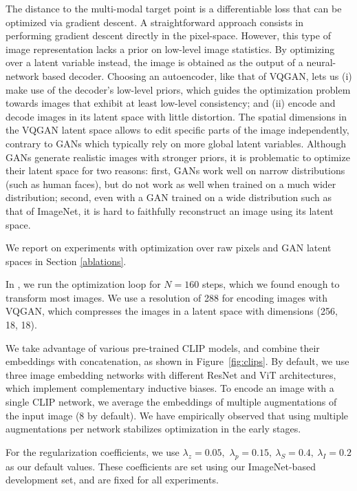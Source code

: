 The distance to the multi-modal target point is a differentiable loss that can be 
optimized via gradient descent. A straightforward approach consists in performing
 gradient descent directly in the pixel-space. However, this type of image 
 representation lacks a  prior on low-level image statistics. 
By optimizing over a  latent variable instead, the  image is obtained as the
 output of a neural-network based decoder. Choosing an autoencoder, like that of 
 VQGAN, lets us (i) make use of the decoder's low-level priors, which guides the 
 optimization problem towards images that exhibit at least low-level consistency;
  and (ii) encode and decode images in its latent space with little distortion. 
  The spatial dimensions in the VQGAN latent space allows to edit specific parts
   of the image independently, contrary to GANs which typically rely on more global 
   latent variables. 
Although GANs generate realistic images with stronger priors, it is problematic to
 optimize their latent space for two reasons: first, GANs work  well on narrow 
 distributions (such as human faces), but do not work as well when trained  on a much 
 wider distribution;
second, even with a GAN trained on a wide distribution such as that of ImageNet, it
 is hard to faithfully reconstruct  an image using its  latent space.

We report on experiments with optimization over raw pixels and GAN latent spaces in  
Section \ref{ablations}.


In \ours, we run the optimization loop for $N=160$ steps, which we found enough to 
transform most images. We use a resolution of 288 for encoding images with VQGAN,
 which compresses the images in a latent space with dimensions (256, 18, 18). 

We take advantage of  various pre-trained CLIP models, and combine their embeddings
 with concatenation, as shown in Figure~\ref{fig:clips}. 
By default, we use three image embedding networks with  different ResNet  and ViT 
architectures, which implement complementary inductive biases.
%
To encode an image with a single CLIP network, we average the embeddings of multiple
 augmentations of the input image (8 by default). We have empirically observed that 
 using multiple augmentations per network stabilizes optimization in the early stages.

For the regularization coefficients, we use 
$\lambda_z=0.05,$ $\lambda_p = 0.15,\ \lambda_S=0.4,\ \lambda_I = 0.2$ as our 
default values. 
These coefficients are set using 
our ImageNet-based development set, and are fixed for all experiments. 

